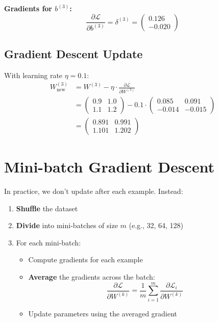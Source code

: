 \textbf{Gradients for $b^{(3)}$:}
\[
\frac{\partial \mathcal{L}}{\partial b^{(3)}} = \delta^{(3)} = \begin{pmatrix} 0.126 \\ -0.020 \end{pmatrix}
\]

\subsection{Gradient Descent Update}

With learning rate $\eta = 0.1$:
\begin{align}
W^{(3)}_{\text{new}} &= W^{(3)} - \eta \cdot \frac{\partial \mathcal{L}}{\partial W^{(3)}} \\
&= \begin{pmatrix} 0.9 & 1.0 \\ 1.1 & 1.2 \end{pmatrix} - 0.1 \cdot \begin{pmatrix} 0.085 & 0.091 \\ -0.014 & -0.015 \end{pmatrix} \\
&= \begin{pmatrix} 0.891 & 0.991 \\ 1.101 & 1.202 \end{pmatrix}
\end{align}

\section{Mini-batch Gradient Descent}

In practice, we don't update after each example. Instead:

\begin{enumerate}
    \item \textbf{Shuffle} the dataset
    \item \textbf{Divide} into mini-batches of size $m$ (e.g., 32, 64, 128)
    \item For each mini-batch:
    \begin{itemize}
        \item Compute gradients for each example
        \item \textbf{Average} the gradients across the batch:
        \[
        \frac{\partial \mathcal{L}}{\partial W^{(k)}} = \frac{1}{m} \sum_{i=1}^{m} \frac{\partial \mathcal{L}_i}{\partial W^{(k)}}
        \]
        \item Update parameters using the averaged gradient
    \end{itemize}
\end{enumerate}


